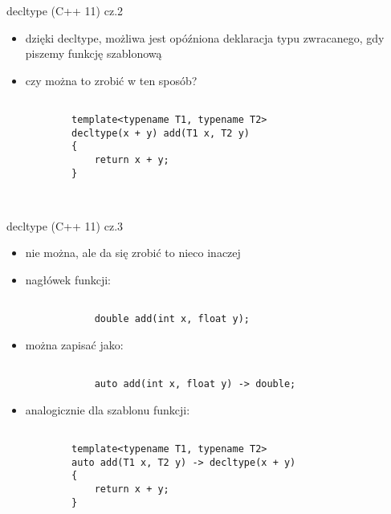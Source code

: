 \documentclass[11pt]{beamer}
\begin{document}
\begin{frame}[fragile]{decltype (C++ 11) cz.2}
	\begin{itemize}
		\item dzięki decltype, możliwa jest opóźniona deklaracja typu zwracanego, gdy piszemy funkcję szablonową
		\item czy można to zrobić w ten sposób?
		
		
		\begin{lstlisting}[frame=single]  % Start your code-block
		
		template<typename T1, typename T2>
		decltype(x + y) add(T1 x, T2 y)
		{
			return x + y;
		}
	
			
		\end{lstlisting}
	\end{itemize}

\end{frame}


\begin{frame}[fragile]{decltype (C++ 11) cz.3}
	\begin{itemize}
		\item nie można, ale da się zrobić to nieco inaczej
		\item nagłówek funkcji:
		
		
		
		\begin{lstlisting}[frame=single]  % Start your code-block
			
			double add(int x, float y);
		\end{lstlisting}
	
		\item można zapisać jako:
		
		\begin{lstlisting}[frame=single]  % Start your code-block
			
			auto add(int x, float y) -> double;
		\end{lstlisting}
		
		\item analogicznie dla szablonu funkcji:
		
		\begin{lstlisting}[frame=single]  % Start your code-block
		
		template<typename T1, typename T2>
		auto add(T1 x, T2 y) -> decltype(x + y)
		{
			return x + y;
		}
	
			
		\end{lstlisting}	
	\end{itemize}

\end{frame}
\end{document}
